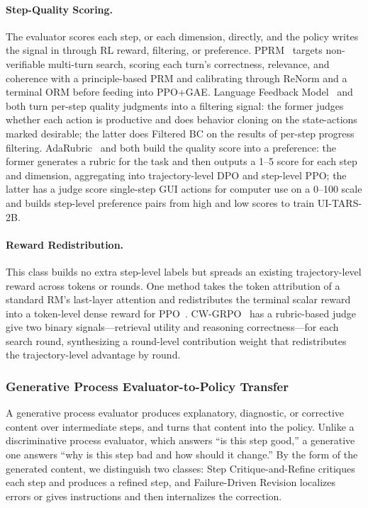 \paragraph{Step-Quality Scoring.} The evaluator scores each step, or each dimension, directly, and the policy writes the signal in through RL reward, filtering, or preference. PPRM~\cite{Xu25h} targets non-verifiable multi-turn search, scoring each turn's correctness, relevance, and coherence with a principle-based PRM and calibrating through ReNorm and a terminal ORM before feeding into PPO+GAE. Language Feedback Model~\cite{Zho24e} and \cite{Pan24b} both turn per-step quality judgments into a filtering signal: the former judges whether each action is productive and does behavior cloning on the state-actions marked desirable; the latter does Filtered BC on the results of per-step progress filtering. AdaRubric~\cite{Din26e} and \cite{Luo25f} both build the quality score into a preference: the former generates a rubric for the task and then outputs a 1--5 score for each step and dimension, aggregating into trajectory-level DPO and step-level PPO; the latter has a judge score single-step GUI actions for computer use on a 0--100 scale and builds step-level preference pairs from high and low scores to train UI-TARS-2B.

\paragraph{Reward Redistribution.} This class builds no extra step-level labels but spreads an existing trajectory-level reward across tokens or rounds. One method takes the token attribution of a standard RM's last-layer attention and redistributes the terminal scalar reward into a token-level dense reward for PPO~\cite{Cha24b}. CW-GRPO~\cite{Wan26ac} has a rubric-based judge give two binary signals---retrieval utility and reasoning correctness---for each search round, synthesizing a round-level contribution weight that redistributes the trajectory-level advantage by round.

\subsubsection{Generative Process Evaluator-to-Policy Transfer}
\label{sec:gen-process-transfer}

A generative process evaluator produces explanatory, diagnostic, or corrective content over intermediate steps, and turns that content into the policy. Unlike a discriminative process evaluator, which answers ``is this step good,'' a generative one answers ``why is this step bad and how should it change.'' By the form of the generated content, we distinguish two classes: Step Critique-and-Refine critiques each step and produces a refined step, and Failure-Driven Revision localizes errors or gives instructions and then internalizes the correction.


